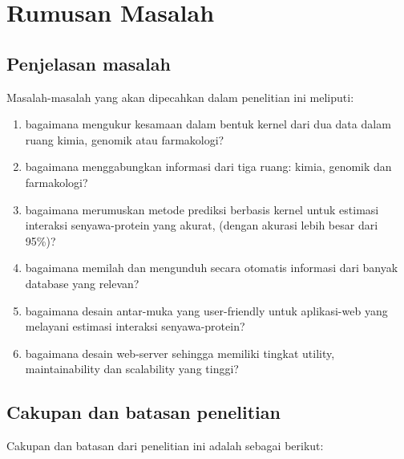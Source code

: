 \chapter{Rumusan Masalah}

\section{Penjelasan masalah}
Masalah-masalah yang akan dipecahkan dalam penelitian ini meliputi:

\begin{enumerate} [topsep=0mm]
\itemsep0mm
\item bagaimana mengukur kesamaan dalam bentuk kernel dari dua data dalam ruang kimia, genomik atau farmakologi?
\item bagaimana menggabungkan informasi dari tiga ruang: kimia, genomik dan farmakologi?
\item bagaimana merumuskan metode prediksi berbasis kernel untuk estimasi interaksi senyawa-protein yang akurat, 
(dengan akurasi lebih besar dari 95\%)?
\item bagaimana memilah dan mengunduh secara otomatis informasi dari banyak database yang relevan?
\item bagaimana desain antar-muka yang user-friendly untuk aplikasi-web yang melayani estimasi interaksi senyawa-protein?
\item bagaimana desain web-server sehingga memiliki tingkat utility, maintainability dan scalability yang tinggi?
\end{enumerate}

\section{Cakupan dan batasan penelitian}
Cakupan dan batasan dari penelitian ini adalah sebagai berikut:

